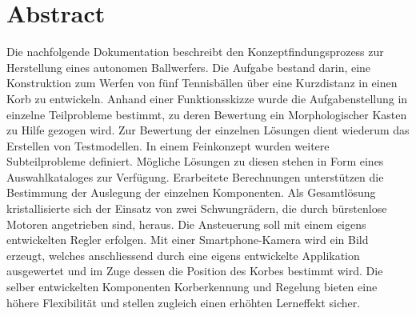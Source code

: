 \section*{Abstract}
Die nachfolgende Dokumentation beschreibt den Konzeptfindungsprozess zur Herstellung eines autonomen Ballwerfers. Die Aufgabe bestand darin, eine Konstruktion zum Werfen von fünf Tennisbällen über eine Kurzdistanz in einen Korb zu entwickeln. Anhand einer Funktionsskizze wurde die Aufgabenstellung in einzelne Teilprobleme bestimmt, zu deren Bewertung ein Morphologischer Kasten zu Hilfe gezogen wird. Zur Bewertung der einzelnen Lösungen dient wiederum das Erstellen von Testmodellen. In einem Feinkonzept wurden weitere Subteilprobleme definiert. Mögliche Lösungen zu diesen stehen in Form eines Auswahlkataloges zur Verfügung. Erarbeitete Berechnungen unterstützen die Bestimmung der Auslegung der einzelnen Komponenten. Als Gesamtlösung kristallisierte sich der Einsatz von zwei Schwungrädern, die durch bürstenlose Motoren angetrieben sind, heraus. Die Ansteuerung soll mit einem eigens entwickelten Regler erfolgen. Mit einer Smartphone-Kamera wird ein Bild erzeugt, welches anschliessend durch eine eigens entwickelte Applikation ausgewertet und im Zuge dessen die Position des Korbes bestimmt wird. Die selber entwickelten Komponenten Korberkennung und Regelung bieten eine höhere Flexibilität und stellen zugleich einen erhöhten Lerneffekt sicher.
